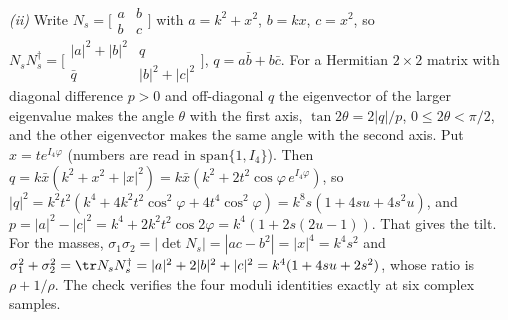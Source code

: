 \emph{(ii)} Write $N_{s} = \bigl[\begin{smallmatrix} a & b\\ b & c\end{smallmatrix}\bigr]$ with $a = k^{2} + x^{2}$, $b = kx$, $c = x^{2}$, so $N_{s}N_{s}^{\dagger} = \bigl[\begin{smallmatrix} |a|^{2} + |b|^{2} & q\\ \bar{q} & |b|^{2} + |c|^{2}\end{smallmatrix}\bigr]$, $q = a\bar{b} + b\bar{c}$. For a Hermitian $2 \times 2$ matrix with diagonal difference $p > 0$ and off-diagonal $q$ the eigenvector of the larger eigenvalue makes the angle $\theta$ with the first axis, $\tan 2\theta = 2|q|/p$, $0 \le 2\theta < \pi/2$, and the other eigenvector makes the same angle with the second axis. Put $x = te^{I_{4}\varphi}$ (numbers are read in $\mathrm{span}\{1, I_{4}\}$). Then $q = k\bar{x}(k^{2} + x^{2} + |x|^{2}) = k\bar{x}(k^{2} + 2t^{2}\cos\varphi\,e^{I_{4}\varphi})$, so $|q|^{2} = k^{2}t^{2}(k^{4} + 4k^{2}t^{2}\cos^{2}\varphi + 4t^{4}\cos^{2}\varphi) = k^{8}s(1 + 4su + 4s^{2}u)$, and $p = |a|^{2} - |c|^{2} = k^{4} + 2k^{2}t^{2}\cos 2\varphi = k^{4}(1 + 2s(2u - 1))$. That gives the tilt. For the masses, $\sigma_{1}\sigma_{2} = |\det N_{s}| = |ac - b^{2}| = |x|^{4} = k^{4}s^{2}$ and $\sigma_{1}^{2} + \sigma_{2}^{2} = \tr N_{s}N_{s}^{\dagger} = |a|^{2} + 2|b|^{2} + |c|^{2} = k^{4}(1 + 4su + 2s^{2})$, whose ratio is $\rho + 1/\rho$. The check verifies the four moduli identities exactly at six complex samples.


